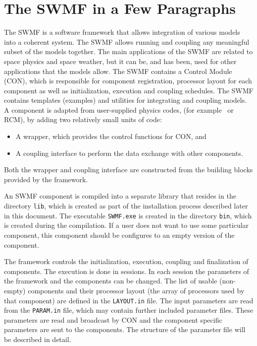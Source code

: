 \section{The SWMF in a Few Paragraphs}

The SWMF is a software framework that allows integration
of various models into a coherent system. The SWMF allows
running and coupling any meaningful subset of the models together.
The main applications of the SWMF are related to space
physics and space weather, but it can be, and has been, used for 
other applications that the models allow.
The SWMF contains a Control Module (CON), which is responsible for
component registration, processor layout for each component as well
as initialization, execution and coupling schedules.  
The SWMF contains templates (examples) and utilities for 
integrating and coupling models. 
A component is adapted from user-supplied physics codes,
(for example \BATSRUS\ or RCM), by adding two relatively small units
of code:
\begin{itemize}
\item A wrapper, which provides the control functions for CON, and
\item A coupling interface to perform the data exchange with other
components.
\end{itemize}
Both the wrapper and coupling interface are constructed from the
building blocks provided by the framework. 

An SWMF component is compiled into a separate library that resides in
the directory {\tt lib}, which is created as part of the installation
process described later in this document. The executable {\tt SWMF.exe}
is created in the
directory {\tt bin}, which is created during the compilation.  If a
user does not want to use some particular component, this component
should be configures to an empty version of the component.

The framework controls the initialization, execution, coupling and
finalization of components.  The execution is done in sessions. In
each session the parameters of the framework and the components can be
changed. The list of usable (non-empty) components and their 
processor layout (the array of processors used by that component)
are defined in the {\tt LAYOUT.in} file.
The input parameters are read from the {\tt PARAM.in} file, which
may contain further included parameter files.  These parameters are
read and broadcast by CON and the component specific parameters are
sent to the components. The structure of the parameter file will be
described in detail.

